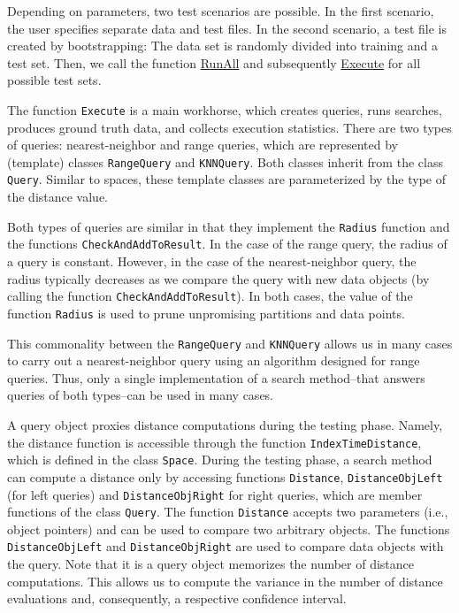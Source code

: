 \documentclass[runningheads,a4paper]{llncs}
\newcommand{\ttt}[1]{\texttt{#1}}
\begin{document}
Depending on parameters, two test scenarios are possible.
In the first scenario, the user specifies separate data and test files.
In the second scenario, a test file is created by bootstrapping:
The data set is randomly divided into training and a test set.
Then,
we call the function \href{https://github.com/searchivarius/NonMetricSpaceLib/blob/master/similarity_search/include/experiments.h#L93}{RunAll} 
and subsequently \href{https://github.com/searchivarius/NonMetricSpaceLib/blob/master/similarity_search/include/experiments.h#L221}{Execute} for all possible test sets.

The function \ttt{Execute} is a main workhorse, which creates queries, runs searches,
produces ground truth data, and collects execution statistics.
There are two types of queries: nearest-neighbor and range queries,
which are represented by (template) classes \ttt{RangeQuery} and \ttt{KNNQuery}.
Both classes inherit from the class \ttt{Query}.
Similar to spaces, these template classes are parameterized by the type of the distance value.

Both types of queries are similar in that they implement the \ttt{Radius} function
and the functions \ttt{CheckAndAddToResult}. 
In the case of the range query, the radius of a query is constant.
However, in the case of the nearest-neighbor query,
the radius typically decreases as we compare the query
with new data objects (by calling the function \ttt{CheckAndAddToResult}).
In both cases, the value of the function \ttt{Radius} is used to prune unpromising
partitions and data points.

This commonality between the \ttt{RangeQuery} and \ttt{KNNQuery}
allows us in many cases to carry out a nearest-neighbor query 
using an algorithm designed for range queries.
Thus, only a single implementation of a search method--that answers queries of both types--can be used in many cases.

A query object proxies distance computations during the testing phase.
Namely, the distance function is accessible through the function
\ttt{IndexTimeDistance}, which is defined in the class \ttt{Space}.
During the testing phase, a search method can compute a distance
only by accessing functions \ttt{Distance}, 
\ttt{DistanceObjLeft} (for left queries) and 
\ttt{DistanceObjRight} for right queries,
which are member functions of the class \ttt{Query}.
The function \ttt{Distance} accepts two parameters (i.e., object pointers) and 
can be used to compare two arbitrary objects.
The functions \ttt{DistanceObjLeft} and \ttt{DistanceObjRight} are used 
to compare data objects with the query.
Note that it is a query object  memorizes the number of distance computations.
This allows us to compute the variance in the number of distance evaluations
and, consequently, a respective confidence interval.
\end{document}
